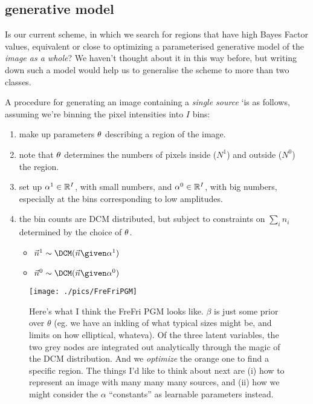\documentclass[12pt]{article}
\begin{document}
\subsection{generative model}
Is our current scheme, in which we search for regions that have high
Bayes Factor values, equivalent or close to optimizing a parameterised
generative model of the \emph{image as a whole}? We haven't thought about it
in this way before, but writing down such a model would help us to
generalise the scheme to more than two classes.

A procedure for generating an image containing a \emph{single source}
`is as follows, assuming we're binning the pixel intensities into $I$ bins:
\begin{enumerate}
\item make up parameters $\mathbf{\theta}$ describing a region of the image.
\item note that $\mathbf{\theta}$ determines the numbers of pixels inside ($N^1$)  and  outside ($N^0$) the region.
\item set up $\mathbf{\alpha}^1 \in \mathbb{R}^I$, with small numbers,
  and $\mathbf{\alpha}^0 \in \mathbb{R}^I$, with big numbers, especially at the bins corresponding to low amplitudes.
\item the bin counts are DCM distributed, but subject to constraints on $\sum_i n_i$ determined by the choice of $\mathbf{\theta}$.
  \begin{itemize}
    \item    $\vec{n}^1 \sim \DCM(\vec{n} \given \balpha^1)$
    \item $\vec{n}^0 \sim \DCM(\vec{n} \given \balpha^0)$
  \end{itemize}
\end{enumerate}


\begin{figure}
\texttt{[image: ./pics/FreFriPGM]}
\caption{Here's what I think the {\sc FreFri} PGM looks like. $\beta$ is just some prior over $\theta$ (eg. we have an inkling of what typical sizes might be, and limits on how elliptical, whateva). Of the three latent variables, the two grey nodes are integrated out analytically through the magic of the DCM distribution. And we {\it optimize} the orange one to find a specific region. The things I'd like to think about next are (i) how to represent an image with many many many sources, and (ii) how we might consider the $\alpha$ ``constants'' as learnable parameters instead.
\label{fig:FreFriPGM}
}
\end{figure}
\end{document}
